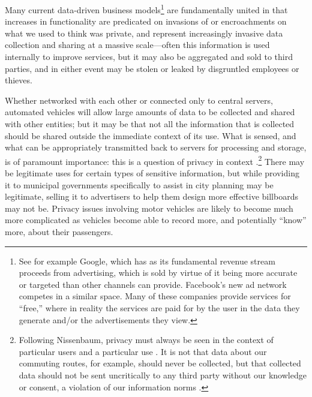 Many current data-driven business models\footnote{See for example
  Google, which has as its fundamental revenue stream proceeds from
  advertising, which is sold by virtue of it being more accurate or
  targeted than other channels can provide. Facebook's new ad network
  competes in a similar space. Many of these companies provide
  services for ``free,'' where in reality the services are paid for by
the user in the data they generate and/or the advertisements they
view.} are fundamentally united in that increases in
functionality are predicated on invasions of or encroachments on what
we used to think was private, and represent increasingly invasive data
collection and sharing at a massive scale---often this information is
used internally to improve services, but it may also be aggregated and
sold to third parties, and in either event may be stolen or leaked by
disgruntled employees or thieves. %

Whether networked with each other or connected only to central
servers, automated vehicles will allow large amounts of data to be collected
and shared with other entities; but it may be that not all the
information that is collected should be shared outside the immediate
context of its use. What is sensed, and what can be appropriately
transmitted back to servers for processing and storage, is of
paramount importance: this is a question of privacy in context
\cite{nissenbaum}.\footnote{Following Nissenbaum, privacy must always
  be seen in the context of 
particular users and a particular use \cite[p. 2]{nissenbaum}. It is not that data about our
commuting routes, for example, should never be collected, but that collected data
should not be sent uncritically to any third party without our
knowledge or consent, a violation of our information norms \cite[p.
  3]{nissenbaum}.}
There
may be legitimate uses for certain types of sensitive information, but
while providing it to municipal governments specifically to assist in
city planning may be legitimate, selling it to advertisers to help
them design more effective billboards may not be. Privacy issues
involving motor vehicles are likely to become much more complicated as
vehicles become able to record more, and potentially ``know'' more,
about their passengers.


